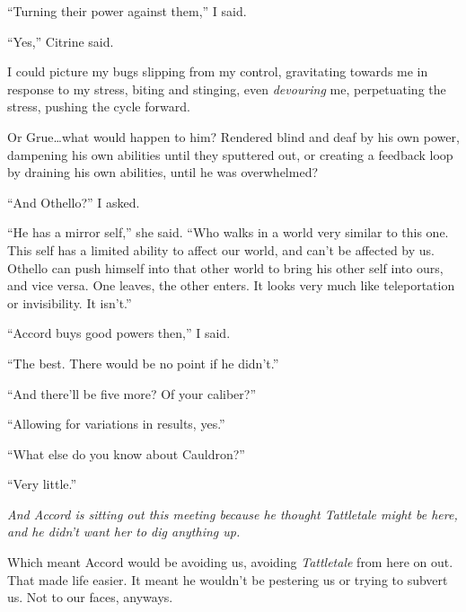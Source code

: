 ``Turning their power against them,'' I said.



``Yes,'' Citrine said.



I could picture my bugs slipping from my control, gravitating towards me in response to my stress, biting and stinging, even \emph{devouring} me, perpetuating the stress, pushing the cycle forward.



Or Grue\ldots what would happen to him?  Rendered blind and deaf by his own power, dampening his own abilities until they sputtered out, or creating a feedback loop by draining his own abilities, until he was overwhelmed?



``And Othello?'' I asked.



``He has a mirror self,'' she said.  ``Who walks in a world very similar to this one.  This self has a limited ability to affect our world, and can't be affected by us.  Othello can push himself into that other world to bring his other self into ours, and vice versa.  One leaves, the other enters.  It looks very much like teleportation or invisibility.  It isn't.''



``Accord buys good powers then,'' I said.



``The best.  There would be no point if he didn't.''



``And there'll be five more?  Of your caliber?''



``Allowing for variations in results, yes.''



``What else do you know about Cauldron?''



``Very little.''



\emph{And Accord is sitting out this meeting because he thought Tattletale might be here, and he didn't want her to dig anything up.}



Which meant Accord would be avoiding us, avoiding \emph{Tattletale} from here on out.  That made life easier.  It meant he wouldn't be pestering us or trying to subvert us.  Not to our faces, anyways.



